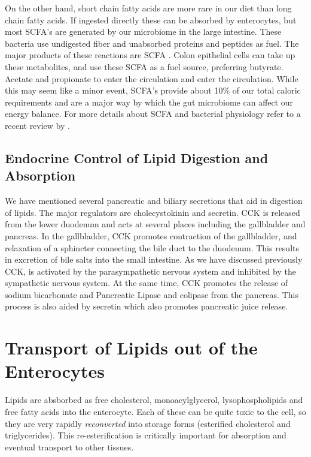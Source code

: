 \documentclass{tufte-handout}
\begin{document}
  On the other hand, short chain fatty acids are more rare in our diet than long chain fatty acids.  If ingested directly these can be absorbed by enterocytes, but most SCFA's are generated by our microbiome in the large intestine.  These bacteria use undigested fiber and unabsorbed proteins and peptides as fuel.  The major products of these reactions are SCFA \citep{Cummings1987}.  Colon epithelial cells can take up these metabolites, and use these SCFA as a fuel source, preferring butyrate.  Acetate and propionate to enter the circulation and enter the circulation.  While this may seem like a minor event, SCFA's provide about 10\% of our total caloric requirements and are a major way by which the gut microbiome can affect our energy balance.  For more details about SCFA and bacterial physiology refer to a recent review by \citet{Koh2016}.

\subsection{Endocrine Control of Lipid Digestion and Absorption}

We have mentioned several pancreatic and biliary secretions that aid in digestion of lipids.  The major regulators are cholecystokinin and secretin.  CCK is released from the lower duodenum and acts at several places including the gallbladder and pancreas.  In the gallbladder, CCK promotes contraction of the gallbladder, and relaxation of a sphincter connecting the bile duct to the duodenum.  This results in excretion of bile salts into the small intestine.  As we have discussed previously CCK, is activated by the parasympathetic nervous system and inhibited by the sympathetic nervous system.  At the same time, CCK promotes the release of sodium bicarbonate and Pancreatic Lipase and colipase from the pancreas.  This process is also aided by secretin which also promotes pancreatic juice release.

\section{Transport of Lipids out of the Enterocytes}

Lipids are absborbed as free cholesterol, monoacylglycerol, lysophospholipids and free fatty acids into the enterocyte.  Each of these can be quite toxic to the cell, so they are very rapidly \emph{reconverted} into storage forms (esterified cholesterol and triglycerides).  This re-esterification is critically important for absorption and eventual transport to other tissues.
\end{document}
